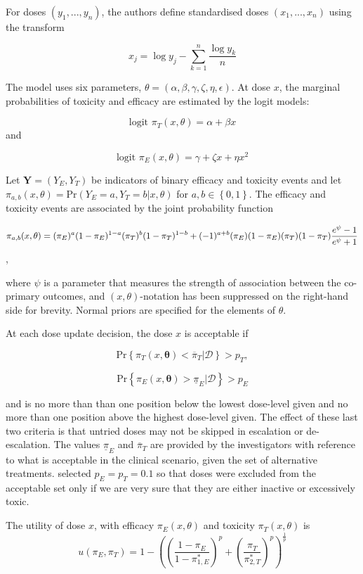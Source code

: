\documentclass[article]{jss}
\begin{document}
For doses \((y_1, ..., y_n)\), the authors define standardised doses
\((x_1, ..., x_n)\) using the transform

\[x_j = \log{y_j} - \sum_{k=1}^n \frac{\log{y_k}}{n}\]

The model uses six parameters,
\(\theta = (\alpha, \beta, \gamma, \zeta, \eta, \epsilon)\). At dose
\(x\), the marginal probabilities of toxicity and efficacy are estimated
by the logit models:

\[\text{logit } \pi_T(x, \theta) = \alpha + \beta x\] and

\[\text{logit } \pi_E(x, \theta) = \gamma + \zeta x + \eta x^2\]

Let \(\boldsymbol{Y} = (Y_E, Y_T)\) be indicators of binary efficacy and
toxicity events and let
\(\pi_{a, b}(x, \theta) = \text{Pr}(Y_E = a, Y_T = b | x, \theta)\) for
\(a, b \in \left\{ 0, 1\right\}\). The efficacy and toxicity events are
associated by the joint probability function

\[\pi_{a,b}(x, \theta) = (\pi_E)^a (1-\pi_E)^{1-a} (\pi_T)^b (1-\pi_T)^{1-b} + \\ (-1)^{a+b} (\pi_E) (1-\pi_E) (\pi_T) (1-\pi_T) \frac{e^\psi-1}{e^\psi+1}\],

where \(\psi\) is a parameter that measures the strength of association
between the co-primary outcomes, and \((x, \theta)\)-notation has been
suppressed on the right-hand side for brevity. Normal priors are
specified for the elements of \(\theta\).

At each dose update decision, the dose \(x\) is acceptable if

\[\text{Pr}\left\{ \pi_T(x, \boldsymbol{\theta}) < \overline{\pi}_T | \mathcal{D} \right\} > p_T,\]

\[\text{Pr}\left\{ \pi_E(x, \boldsymbol{\theta}) > \underline{\pi}_E | \mathcal{D} \right\} > p_E\]

and is no more than than one position below the lowest dose-level given
and no more than one position above the highest dose-level given. The
effect of these last two criteria is that untried doses may not be
skipped in escalation or de-escalation. The values \(\underline{\pi}_E\)
and \(\overline{\pi}_T\) are provided by the investigators with
reference to what is acceptable in the clinical scenario, given the set
of alternative treatments. \citet{Thall2004} selected
\(p_E = p_T = 0.1\) so that doses were excluded from the acceptable set
only if we are very sure that they are either inactive or excessively
toxic.

The utility of dose \(x\), with efficacy \(\pi_E(x, \theta)\) and
toxicity \(\pi_T(x, \theta)\) is
\[u(\pi_E, \pi_T) = 1 - \left( \left(\frac{1-\pi_E}{1-\pi_{1,E}^*}\right)^p + \left(\frac{\pi_T}{\pi_{2,T}^*}\right)^p \right) ^ \frac{1}{p}\]
\end{document}
